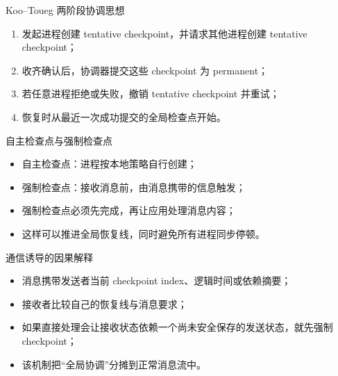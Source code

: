 \documentclass[UTF8,fontset=none,aspectratio=169,10pt]{beamer}
\begin{document}
\begin{frame}{Koo--Toueg 两阶段协调思想}
\begin{enumerate}
  \item 发起进程创建 tentative checkpoint，并请求其他进程创建 tentative checkpoint；
  \item 收齐确认后，协调器提交这些 checkpoint 为 permanent；
  \item 若任意进程拒绝或失败，撤销 tentative checkpoint 并重试；
  \item 恢复时从最近一次成功提交的全局检查点开始。
\end{enumerate}
\vfill
{}
\end{frame}


\begin{frame}{自主检查点与强制检查点}
\begin{itemize}
  \item 自主检查点：进程按本地策略自行创建；
  \item 强制检查点：接收消息前，由消息携带的信息触发；
  \item 强制检查点必须先完成，再让应用处理消息内容；
  \item 这样可以推进全局恢复线，同时避免所有进程同步停顿。
\end{itemize}
\end{frame}

\begin{frame}{通信诱导的因果解释}
\begin{itemize}
  \item 消息携带发送者当前 checkpoint index、逻辑时间或依赖摘要；
  \item 接收者比较自己的恢复线与消息要求；
  \item 如果直接处理会让接收状态依赖一个尚未安全保存的发送状态，就先强制 checkpoint；
  \item 该机制把“全局协调”分摊到正常消息流中。
\end{itemize}
\vfill
{}
\end{frame}

\end{document}
